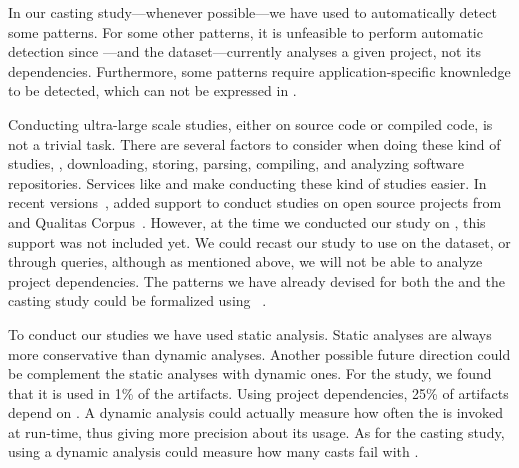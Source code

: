 In our casting study---whenever possible---we have used \ql{} to automatically detect some patterns.
For some other patterns, it is unfeasible to perform automatic detection since \ql{}---and the \lgtm{} dataset---currently analyses a given project,
not its dependencies.
Furthermore, some patterns require application-specific knownledge to be detected,
which can not be expressed in \ql{}.

Conducting ultra-large scale studies, either on source code or compiled code, is not a trivial task.
There are several factors to consider when doing these kind of studies,
\eg{}, downloading, storing, parsing, compiling,
and analyzing software repositories.
Services like \boa{} and \lgtm{} make conducting these kind of studies easier.
In recent versions~\citep{boa-github},
\boa{} added support to conduct studies on open source projects from \github{} and Qualitas Corpus~\citep{temperoQualitasCorpusCurated2010}.
However, at the time we conducted our study on \unsafe{},
this support was not included yet.
We could recast our \unsafe{} study to use \boa{} on the \github{} dataset,
or \lgtm{} through \ql{} queries, although as mentioned above,
we will not be able to analyze project dependencies.
The patterns we have already devised for both the \unsafe{} and the casting study could be formalized using \ql{}~\citep{avgustinovQLObjectorientedQueries2016}.

To conduct our studies we have used static analysis.
Static analyses are always more conservative than dynamic analyses.
Another possible future direction could be complement the static analyses with dynamic ones.
For the \unsafe{} study,
we found that it is used in 1\% of the \mavencentral{} artifacts.
Using project dependencies, 25\% of artifacts depend on \smu{}.
A dynamic analysis could actually measure how often the \unsafe{} \api{} is invoked at run-time,
thus giving more precision about its usage.
As for the casting study,
using a dynamic analysis could measure how many casts fail with .

